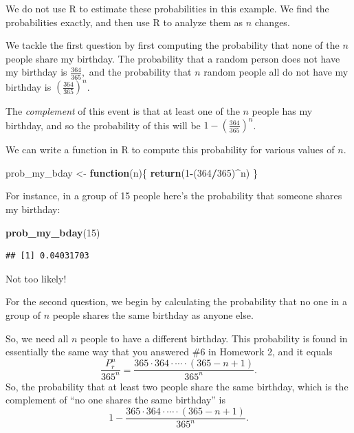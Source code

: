 \documentclass[
]{book}
\newenvironment{Shaded}{\begin{snugshade}}{\end{snugshade}}
\newcommand{\ControlFlowTok}[1]{\textcolor[rgb]{0.13,0.29,0.53}{\textbf{#1}}}
\newcommand{\DecValTok}[1]{\textcolor[rgb]{0.00,0.00,0.81}{#1}}
\newcommand{\FunctionTok}[1]{\textcolor[rgb]{0.13,0.29,0.53}{\textbf{#1}}}
\newcommand{\NormalTok}[1]{#1}
\newcommand{\OtherTok}[1]{\textcolor[rgb]{0.56,0.35,0.01}{#1}}
\newcommand{\SpecialCharTok}[1]{\textcolor[rgb]{0.81,0.36,0.00}{\textbf{#1}}}
\theoremstyle{definition}
\theoremstyle{definition}
\theoremstyle{definition}
\theoremstyle{definition}
\theoremstyle{remark}
\begin{document}
We do not use R to estimate these probabilities in this example. We find the probabilities exactly, and then use R to analyze them as \(n\) changes.

We tackle the first question by first computing the probability that none of the \(n\) people share my birthday. The probability that a random person does not have my birthday is \(\frac{364}{365},\) and the probability that \(n\) random people all do not have my birthday is \(\left(\frac{364}{365}\right)^n\).

The \emph{complement} of this event is that at least one of the \(n\) people has my birthday, and so the probability of this will be \(1- \left(\frac{364}{365}\right)^n\).

We can write a function in R to compute this probability for various values of \(n\).

\begin{Shaded}
\begin{Highlighting}[]
\NormalTok{prob\_my\_bday }\OtherTok{\textless{}{-}} \ControlFlowTok{function}\NormalTok{(n)\{}
  \FunctionTok{return}\NormalTok{(}\DecValTok{1}\SpecialCharTok{{-}}\NormalTok{(}\DecValTok{364}\SpecialCharTok{/}\DecValTok{365}\NormalTok{)}\SpecialCharTok{\^{}}\NormalTok{n)}
\NormalTok{\}}
\end{Highlighting}
\end{Shaded}

For instance, in a group of 15 people here's the probability that someone shares my birthday:

\begin{Shaded}
\begin{Highlighting}[]
\FunctionTok{prob\_my\_bday}\NormalTok{(}\DecValTok{15}\NormalTok{)}
\end{Highlighting}
\end{Shaded}

\begin{verbatim}
## [1] 0.04031703
\end{verbatim}

Not too likely!

For the second question, we begin by calculating the probability that no one in a group of \(n\) people shares the same birthday as anyone else.

So, we need all \(n\) people to have a different birthday. This probability is found in essentially the same way that you answered \#6 in Homework 2, and it equals
\[\frac{P^n_r}{365^n}=\frac{365\cdot 364 \cdot \cdots \cdot (365-n+1)}{365^n}.\]
So, the probability that at least two people share the same birthday, which is the complement of ``no one shares the same birthday'' is \[1 - \frac{365\cdot 364 \cdot \cdots \cdot (365-n+1)}{365^n}.\]
\end{document}
